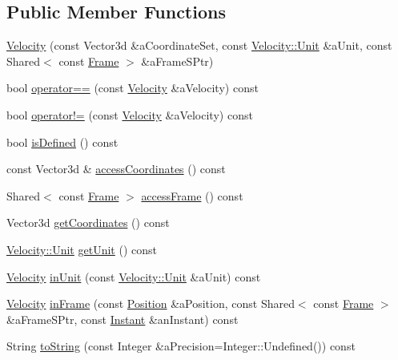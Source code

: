 \subsection*{Public Member Functions}
\begin{DoxyCompactItemize}
\item 
\hyperlink{classlibrary_1_1physics_1_1coord_1_1_velocity_a8fa6aa2464ceddd44b65ef1b1de4c77d}{Velocity} (const Vector3d \&a\+Coordinate\+Set, const \hyperlink{classlibrary_1_1physics_1_1coord_1_1_velocity_a8bbc811932c454dbe0ab8b56f1b2c0b3}{Velocity\+::\+Unit} \&a\+Unit, const Shared$<$ const \hyperlink{classlibrary_1_1physics_1_1coord_1_1_frame}{Frame} $>$ \&a\+Frame\+S\+Ptr)
\item 
bool \hyperlink{classlibrary_1_1physics_1_1coord_1_1_velocity_afa328f637276f940812aea194836aeb9}{operator==} (const \hyperlink{classlibrary_1_1physics_1_1coord_1_1_velocity}{Velocity} \&a\+Velocity) const
\item 
bool \hyperlink{classlibrary_1_1physics_1_1coord_1_1_velocity_aaa76cc11a5ecbbff21839f1ea5f8aa8e}{operator!=} (const \hyperlink{classlibrary_1_1physics_1_1coord_1_1_velocity}{Velocity} \&a\+Velocity) const
\item 
bool \hyperlink{classlibrary_1_1physics_1_1coord_1_1_velocity_a5487f6d50e13d2262bf0726ed8536c99}{is\+Defined} () const
\item 
const Vector3d \& \hyperlink{classlibrary_1_1physics_1_1coord_1_1_velocity_aea8fe9c62293e20393d9a662f277b0e7}{access\+Coordinates} () const
\item 
Shared$<$ const \hyperlink{classlibrary_1_1physics_1_1coord_1_1_frame}{Frame} $>$ \hyperlink{classlibrary_1_1physics_1_1coord_1_1_velocity_a1d3dc032dba7937276b06649cb16a871}{access\+Frame} () const
\item 
Vector3d \hyperlink{classlibrary_1_1physics_1_1coord_1_1_velocity_a1ac18f97a304ac026c2544292b89e030}{get\+Coordinates} () const
\item 
\hyperlink{classlibrary_1_1physics_1_1coord_1_1_velocity_a8bbc811932c454dbe0ab8b56f1b2c0b3}{Velocity\+::\+Unit} \hyperlink{classlibrary_1_1physics_1_1coord_1_1_velocity_aa04a5b82a46d5ea4e92bf53046a18494}{get\+Unit} () const
\item 
\hyperlink{classlibrary_1_1physics_1_1coord_1_1_velocity}{Velocity} \hyperlink{classlibrary_1_1physics_1_1coord_1_1_velocity_a814e6740d6b54cf5421d9aa7fc0f5958}{in\+Unit} (const \hyperlink{classlibrary_1_1physics_1_1coord_1_1_velocity_a8bbc811932c454dbe0ab8b56f1b2c0b3}{Velocity\+::\+Unit} \&a\+Unit) const
\item 
\hyperlink{classlibrary_1_1physics_1_1coord_1_1_velocity}{Velocity} \hyperlink{classlibrary_1_1physics_1_1coord_1_1_velocity_a2c6cf9ff38a1352b3e87578e0d2cb132}{in\+Frame} (const \hyperlink{classlibrary_1_1physics_1_1coord_1_1_position}{Position} \&a\+Position, const Shared$<$ const \hyperlink{classlibrary_1_1physics_1_1coord_1_1_frame}{Frame} $>$ \&a\+Frame\+S\+Ptr, const \hyperlink{classlibrary_1_1physics_1_1time_1_1_instant}{Instant} \&an\+Instant) const
\item 
String \hyperlink{classlibrary_1_1physics_1_1coord_1_1_velocity_a16c176cadc68b384eb3d8e5594b316bd}{to\+String} (const Integer \&a\+Precision=Integer\+::\+Undefined()) const
\end{DoxyCompactItemize}
